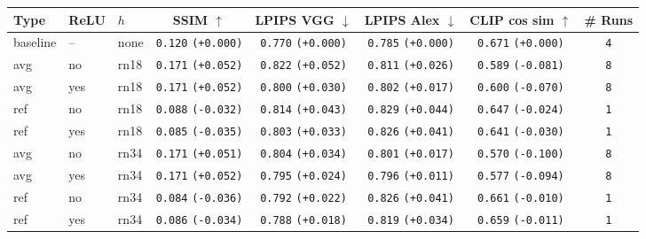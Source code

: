 \begin{tabular}{|l|l|l|c|c|c|c|c|}
\hline
Type & ReLU & $h$ & SSIM $\uparrow$ & LPIPS VGG $\downarrow$ & LPIPS Alex $\downarrow$ & CLIP cos sim $\uparrow$  & \# Runs \\
\hline
baseline & -- & none & \texttt{0.120} {\color{black}\texttt{(+0.000)}}& \texttt{0.770} {\color{black}\texttt{(+0.000)}} & \texttt{0.785} {\color{black}\texttt{(+0.000)}} & \texttt{0.671} {\color{black}\texttt{(+0.000)}} & \texttt{4}\\
avg & no & rn18 & \texttt{0.171} {\color{green}\texttt{(+0.052)}} & \texttt{0.822} {\color{red}\texttt{(+0.052)}} & \texttt{0.811} {\color{red}\texttt{(+0.026)}} & \texttt{0.589} {\color{red}\texttt{(-0.081)}} & \texttt{8}\\
avg & yes & rn18 & \texttt{0.171} {\color{green}\texttt{(+0.052)}} & \texttt{0.800} {\color{red}\texttt{(+0.030)}} & \texttt{0.802} {\color{red}\texttt{(+0.017)}} & \texttt{0.600} {\color{red}\texttt{(-0.070)}} & \texttt{8}\\
ref & no & rn18 & \texttt{0.088} {\color{red}\texttt{(-0.032)}} & \texttt{0.814} {\color{red}\texttt{(+0.043)}} & \texttt{0.829} {\color{red}\texttt{(+0.044)}} & \texttt{0.647} {\color{red}\texttt{(-0.024)}} & \texttt{1}\\
ref & yes & rn18 & \texttt{0.085} {\color{red}\texttt{(-0.035)}} & \texttt{0.803} {\color{red}\texttt{(+0.033)}} & \texttt{0.826} {\color{red}\texttt{(+0.041)}} & \texttt{0.641} {\color{red}\texttt{(-0.030)}} & \texttt{1}\\
avg & no & rn34 & \texttt{0.171} {\color{green}\texttt{(+0.051)}} & \texttt{0.804} {\color{red}\texttt{(+0.034)}} & \texttt{0.801} {\color{red}\texttt{(+0.017)}} & \texttt{0.570} {\color{red}\texttt{(-0.100)}} & \texttt{8}\\
avg & yes & rn34 & \texttt{0.171} {\color{green}\texttt{(+0.052)}} & \texttt{0.795} {\color{red}\texttt{(+0.024)}} & \texttt{0.796} {\color{red}\texttt{(+0.011)}} & \texttt{0.577} {\color{red}\texttt{(-0.094)}} & \texttt{8}\\
ref & no & rn34 & \texttt{0.084} {\color{red}\texttt{(-0.036)}} & \texttt{0.792} {\color{red}\texttt{(+0.022)}} & \texttt{0.826} {\color{red}\texttt{(+0.041)}} & \texttt{0.661} {\color{red}\texttt{(-0.010)}} & \texttt{1}\\
ref & yes & rn34 & \texttt{0.086} {\color{red}\texttt{(-0.034)}} & \texttt{0.788} {\color{red}\texttt{(+0.018)}} & \texttt{0.819} {\color{red}\texttt{(+0.034)}} & \texttt{0.659} {\color{red}\texttt{(-0.011)}} & \texttt{1}\\

\end{tabular}
